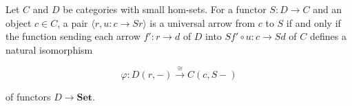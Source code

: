Let $C$ and $D$ be categories with small hom-sets. For a functor $S \colon D \to C$ and an object $c \in C$, a pair $\langle r, u \colon c \to Sr \rangle$ is a universal arrow from $c$ to $S$ if and only if the function sending each arrow $f' \colon r \to d$ of $D$ into $Sf' \circ u \colon c \to Sd$ of $C$ defines a natural isomorphism

$$
\varphi \colon D(r, -) \xrightarrow{\cong} C(c, S -)
$$

of functors $D \to \mathbf{Set}$.
